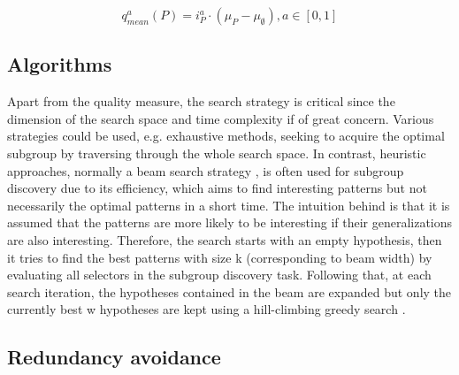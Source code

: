 \begin{equation}  \label{eq:mean_based}
q_{mean}^{a}(P)=i_{P}^{a} \cdot\left(\mu_{P}-\mu_{\emptyset}\right), a \in[0,1]
\end{equation}


\subsection{Algorithms}
Apart from the quality measure, the search strategy is critical since the dimension of the search space and time complexity if of great concern. Various strategies could be used, e.g. exhaustive methods, seeking to acquire the optimal subgroup by traversing through the whole search space. In contrast, heuristic approaches, normally a beam search strategy \cite{clark1989cn2}, is often used for subgroup discovery due to its efficiency, which aims to find interesting patterns but not necessarily the optimal patterns in a short time. The intuition behind is that it is assumed that the patterns are more likely to be interesting if their generalizations are also interesting. Therefore, the search starts with an empty hypothesis, then it tries to find the best patterns with size k (corresponding to beam width) by evaluating all selectors in the subgroup discovery task. Following that, at each search iteration, the hypotheses contained in the beam are expanded but only the currently best w hypotheses are kept using a hill-climbing greedy search \cite{atzmueller2015subgroup}. 

\subsection{Redundancy avoidance}


